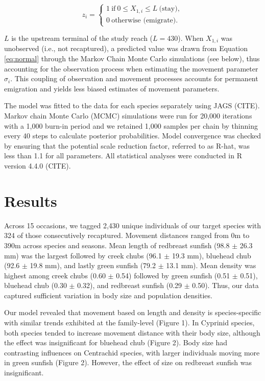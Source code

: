 \documentclass[11pt, class=article, crop=false]{standalone}
\begin{document}
\begin{equation}
    z_i =
    \begin{cases}
        1~\text{if}~0 \le X_{1,i} \le L~\text{(stay)},\\
        0~\text{otherwise (emigrate)}.
    \end{cases}
\end{equation}

$L$ is the upstream terminal of the study reach ($L = 430$). When $X_{1,i}$ was unobserved (i.e., not recaptured), a predicted value was drawn from Equation \ref{eq:normal} through the Markov Chain Monte Carlo simulations (see below), thus accounting for the observation process when estimating the movement parameter $\sigma_i$.
This coupling of observation and movement processes accounts for permanent emigration and yields less biased estimates of movement parameters.

The model was fitted to the data for each species separately using JAGS (CITE). Markov chain Monte Carlo (MCMC) simulations were run for 20,000 iterations with a 1,000 burn-in period and we retained 1,000 samples per chain by thinning every 40 steps to calculate posterior probabilities. Model convergence was checked by ensuring that the potential scale reduction factor, referred to as R-hat, was less than 1.1 for all parameters. All statistical analyses were conducted in R version 4.4.0 (CITE).

\section{Results}

Across 15 occasions, we tagged 2,430 unique individuals of our target species with 324 of those consecutively recaptured. Movement distances ranged from 0m to 390m across species and seasons. Mean length of redbreast sunfish (98.8 $\pm$ 26.3 mm) was the largest followed by creek chubs (96.1 $\pm$ 19.3 mm), bluehead chub (92.6 $\pm$ 19.8 mm), and lastly green sunfish (79.2 $\pm$ 13.1 mm). Mean density was highest among creek chubs (0.60 $\pm$ 0.54) followed by green sunfish (0.51 $\pm$ 0.51), bluehead chub (0.30 $\pm$ 0.32), and redbreast sunfish (0.29 $\pm$ 0.50). Thus, our data captured sufficient variation in body size and population densities. 

Our model revealed that movement based on length and density is species-specific with similar trends exhibited at the family-level (Figure 1). In Cyprinid species, both species tended to increase movement distance with their body size, although the effect was insignificant for bluehead chub (Figure 2). Body size had contrasting influences on Centrachid species, with larger individuals moving more in green sunfish (Figure 2). However, the effect of size on redbreast sunfish was insignificant.
\end{document}

